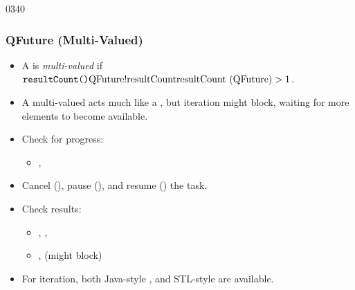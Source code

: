 \begin{slide}{0340}
\frametitle{QFuture (Multi-Valued)}
  \begin{itemize}
  \item A  is \emph{multi-valued} if
    $\hbox{\hClsFn{QFuture}{resultCount}}>1$.
  \item A multi-valued  acts much like a
    , but iteration might block, waiting for more elements
    to become available.
  \item Check for progress:
    \begin{itemize}
    \item {}, 
    \end{itemize}
  \item Cancel (), pause
    (), and resume ()
    the task.
  \item Check results:
    \begin{itemize}
    \item {}, ,
    \item {},  (might block)
    \end{itemize}
  \item For iteration, both Java-style , and
    STL-style  are available.
\end{itemize}
\end{slide}
